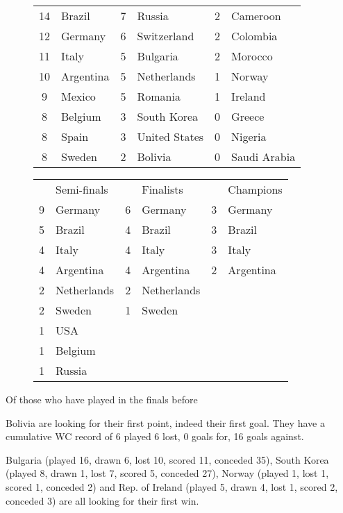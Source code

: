 \begin{figure}[H]
\begin{tabular}{c l c l c l}
14 & Brazil & 7 & Russia & 2 & Cameroon \\
12 & Germany  &  6 & Switzerland & 2 & Colombia  \\         
11 & Italy & 5 & Bulgaria & 2 & Morocco  \\
10 & Argentina  & 5 & Netherlands & 1 & Norway  \\
 9 & Mexico  & 5 & Romania & 1 & Ireland \\
 8 & Belgium & 3 & South Korea & 0 & Greece \\    
 8 & Spain & 3 & United States & 0 & Nigeria \\    
 8 & Sweden & 2 & Bolivia & 0 & Saudi Arabia \\
\end{tabular}                                                   
\end{figure}
\begin{figure}[H]
\begin{tabular}{c l c l c l}
& Semi-finals  & & Finalists & & Champions \\                                                                         
9 & Germany & 6  & Germany & 3  & Germany  \\
5 & Brazil & 4  & Brazil & 3  & Brazil \\
4 & Italy & 4  & Italy & 3 & Italy \\
4 & Argentina & 4  & Argentina & 2  & Argentina \\
2 & Netherlands & 2  & Netherlands & & \\        
2 & Sweden & 1  & Sweden & & \\
1 & USA & & & & \\
1 & Belgium & & & & \\
1 & Russia  & & & & \\
\end{tabular}
\end{figure}
Of those who have played in the finals before

Bolivia are looking for their first point, indeed their first goal. They have a
cumulative WC record of 6 played 6 lost, 0 goals for, 16 goals against.

Bulgaria (played 16, drawn 6, lost 10, scored 11, conceded 35),
South Korea (played 8, drawn 1, lost 7, scored 5, conceded 27),
Norway (played 1, lost 1, scored 1, conceded 2) and 
Rep. of Ireland (played 5, drawn 4, lost 1, scored 2, conceded 3) 
are all looking for their first win.

